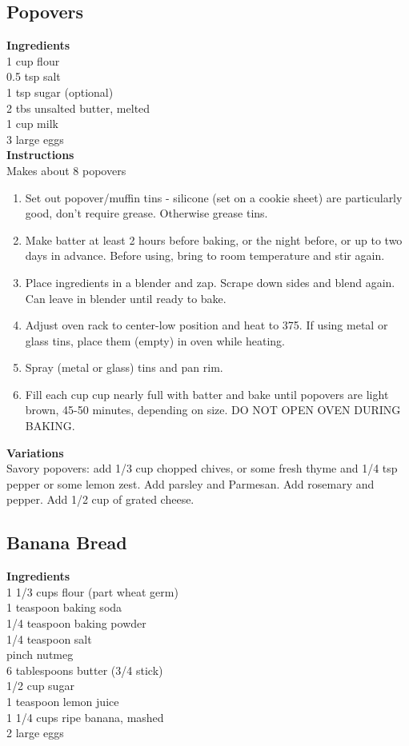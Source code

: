 \documentclass{article}
\numberwithin{figure}{section}
\numberwithin{equation}{section}
\begin{document}
\pagebreak
\subsection{Popovers}
{\bf Ingredients}\\
1 cup flour\\
0.5 tsp salt\\
1 tsp sugar (optional)\\
2 tbs unsalted butter, melted\\
1 cup milk\\
3 large eggs\\

{\bf Instructions}\\
Makes about 8 popovers
\begin{enumerate}
\item Set out popover/muffin tins - silicone (set on a cookie sheet) are particularly good, don't require grease. Otherwise grease tins.
\item Make batter at least 2 hours before baking, or the night before, or up to two days in advance. Before using, bring to room temperature and stir again.
\item Place ingredients in a blender and zap. Scrape down sides and blend again. Can leave in blender until ready to bake.
\item Adjust oven rack to center-low position and heat to 375. If using metal or glass tins, place them (empty) in oven while heating.
\item Spray (metal or glass) tins and pan rim.
\item Fill each cup cup nearly full with batter and bake until popovers are light brown, 45-50 minutes, depending on size.  DO NOT OPEN OVEN DURING BAKING.
\end{enumerate}

{\bf Variations}\\
Savory popovers: add 1/3 cup chopped chives, or some fresh thyme and 1/4 tsp pepper or some lemon zest. Add parsley and Parmesan. Add rosemary and pepper. Add 1/2 cup of grated cheese.

\pagebreak
\subsection{Banana Bread}
{\bf Ingredients}\\
1 1/3 cups flour (part wheat germ)\\
1 teaspoon baking soda\\
1/4 teaspoon baking powder\\
1/4 teaspoon salt\\
pinch nutmeg\\
6 tablespoons butter (3/4 stick)\\
1/2 cup sugar\\
1 teaspoon lemon juice\\
1 1/4 cups ripe banana, mashed\\
2 large eggs\\
\end{document}
